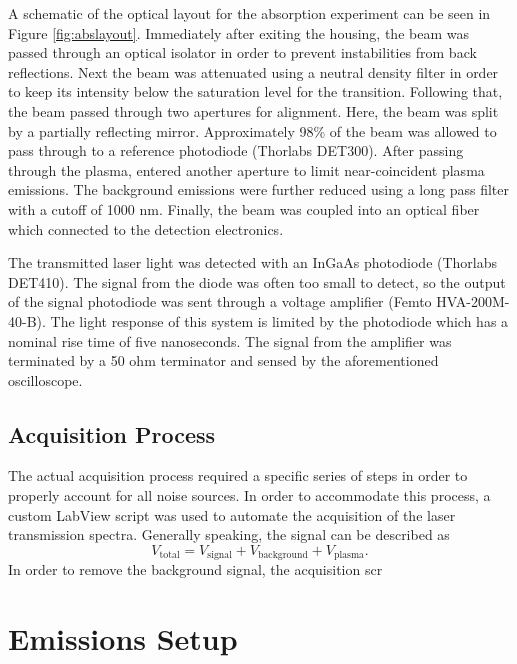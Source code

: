 A schematic of the optical layout for the absorption experiment can be
seen in Figure \ref{fig:abslayout}. Immediately after exiting the
housing, the beam was passed through an optical isolator in order to
prevent instabilities from back reflections. Next the beam was
attenuated using a neutral density filter in order to keep its intensity
below the saturation level for the transition. Following that, the beam
passed through two apertures for alignment. Here, the beam was split by
a partially reflecting mirror. Approximately 98\% of the beam was
allowed to pass through to a reference photodiode (Thorlabs DET300).
After passing through the plasma, entered another aperture to limit
near-coincident plasma emissions. The background emissions were further
reduced using a long pass filter with a cutoff of 1000 nm. Finally, the
beam was coupled into an optical fiber which connected to the detection
electronics.

The transmitted laser light was detected with an InGaAs photodiode
(Thorlabs DET410). The signal from the diode was often too small to
detect, so the output of the signal photodiode was sent through a
voltage amplifier (Femto HVA-200M-40-B). The light response of this
system is limited by the photodiode which has a nominal rise time of
five nanoseconds. The signal from the amplifier was terminated by a 50
ohm terminator and sensed by the aforementioned oscilloscope.

\subsection{Acquisition Process} The actual acquisition process required
a specific series of steps in order to properly account for all noise
sources. In order to accommodate this process, a custom LabView script
was used to automate the acquisition of the laser transmission spectra.
Generally speaking, the signal can be described as
\begin{equation}
  V_\mathrm{total} = V_\mathrm{signal} + V_\mathrm{background} +
                     V_\mathrm{plasma}.
\end{equation}
In order to remove the background signal, the acquisition scr

\section{Emissions Setup}
